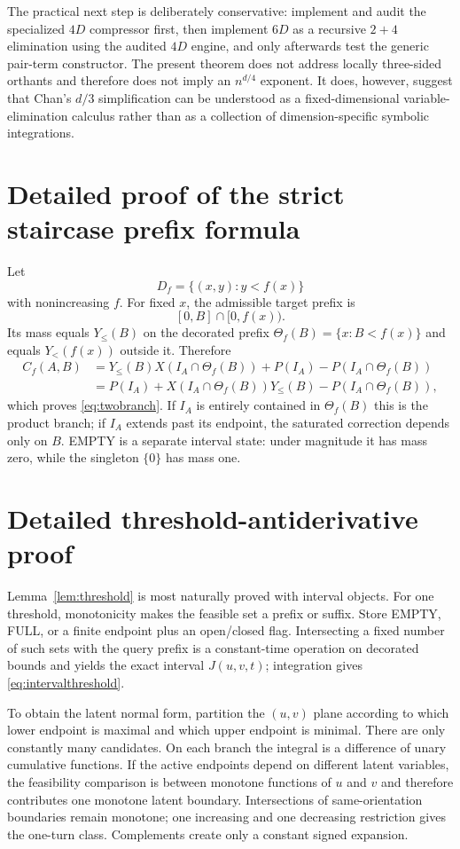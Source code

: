 \documentclass[12pt,a4paper]{article}
\theoremstyle{definition}
\newcommand{\1}{\mathbf 1}
\begin{document}
The practical next step is deliberately conservative: implement and audit the specialized $4D$ compressor first, then implement $6D$ as a recursive $2+4$ elimination using the audited $4D$ engine, and only afterwards test the generic pair-term constructor.  The present theorem does not address locally three-sided orthants and therefore does not imply an $n^{d/4}$ exponent.  It does, however, suggest that Chan's $d/3$ simplification can be understood as a fixed-dimensional variable-elimination calculus rather than as a collection of dimension-specific symbolic integrations.

\section{Detailed proof of the strict staircase prefix formula}       \label{app:twobranch}

Let
\[
D_f=\{(x,y):y<f(x)\}
\]
with nonincreasing $f$.  For fixed $x$, the admissible target prefix is
\[
[0,B]\cap[0,f(x)).
\]
Its mass equals $Y_{\le}(B)$ on the decorated prefix $\Theta_f(B)=\{x:B<f(x)\}$ and equals $Y_{<}(f(x))$ outside it.  Therefore
\[
\begin{aligned}
C_f(A,B)
&=Y_{\le}(B)X(I_A\cap\Theta_f(B))
  +P(I_A)-P(I_A\cap\Theta_f(B))\\
&=P(I_A)+X(I_A\cap\Theta_f(B))Y_{\le}(B)
  -P(I_A\cap\Theta_f(B)),
\end{aligned}
\]
which proves \eqref{eq:twobranch}.  If $I_A$ is entirely contained in $\Theta_f(B)$ this is the product branch; if $I_A$ extends past its endpoint, the saturated correction depends only on $B$.  EMPTY is a separate interval state: under magnitude it has mass zero, while the singleton $\{0\}$ has mass one.

\section{Detailed threshold-antiderivative proof}                  \label{app:thresholdproof}

Lemma~\ref{lem:threshold} is most naturally proved with interval objects.  For one threshold, monotonicity makes the feasible set a prefix or suffix.  Store EMPTY, FULL, or a finite endpoint plus an open/closed flag.  Intersecting a fixed number of such sets with the query prefix is a constant-time operation on decorated bounds and yields the exact interval $J(u,v,t)$; integration gives \eqref{eq:intervalthreshold}.

To obtain the latent normal form, partition the $(u,v)$ plane according to which lower endpoint is maximal and which upper endpoint is minimal.  There are only constantly many candidates.  On each branch the integral is a difference of unary cumulative functions.  If the active endpoints depend on different latent variables, the feasibility comparison is between monotone functions of $u$ and $v$ and therefore contributes one monotone latent boundary.  Intersections of same-orientation boundaries remain monotone; one increasing and one decreasing restriction gives the one-turn class.  Complements create only a constant signed expansion.
\end{document}
